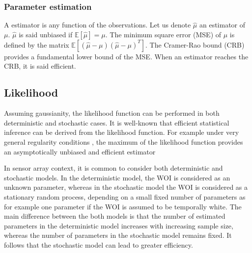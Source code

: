 \documentclass[graybox]{svmult/styles/svmult}
\def\hat{\widehat}
\newcommand{\esp}[1]{\mathds{E}\left[ #1 \right]}
\begin{document}
\subsubsection{Parameter estimation}
A estimator is any function of the observations. Let us denote $\hat\mu$ an estimator of $\mu$.  $\hat\mu$  is said unbiased if $\esp{\hat\mu}=\mu$. The minimum square error (MSE) of $\mu$ is defined by the matrix $\esp{(\hat\mu-\mu)(\hat\mu-\mu)^{T}}$. The Cramer-Rao bound (CRB) provides a fundamental lower bound of the MSE. When an estimator reaches the CRB, it is said efficient.


\subsection{Likelihood}
Assuming gaussianity, the likelihood function can be performed in both  deterministic and stochastic cases.
It is well-known that efficient statistical inference can be derived from the likelihood function. For example under very general regularity conditions \cite{?}, the maximum of the likelihood function provides an asymptotically unbiased and efficient estimator 

In sensor array context, it is common to consider both deterministic and stochastic models. In the deterministic model, the WOI is considered as an unknown parameter, whereas in the stochastic model the WOI is considered as a stationary random process, depending on a small fixed number of parameters as for example one parameter if the WOI is assumed to be temporally white. The main difference between the both models is that the number of estimated parameters in the deterministic model increases with increasing sample size, whereas the number of parameters in the stochastic model remains fixed. It follows that the stochastic model can lead to greater efficiency.


\end{document}
